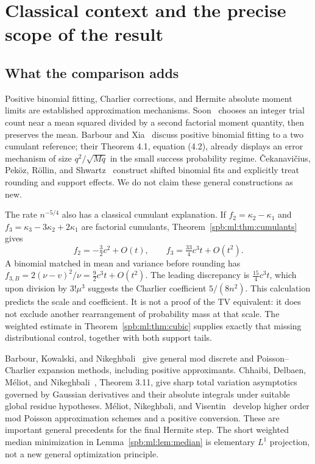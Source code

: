 \section{Classical context and the precise scope of the result}\label{spb:ml:sec:context}
\subsection{What the comparison adds}
Positive binomial fitting, Charlier corrections, and Hermite absolute moment limits are established approximation mechanisms. Soon~\cite{soon} chooses an integer trial count near a mean squared divided by a second factorial moment quantity, then preserves the mean. Barbour and Xia~\cite{bx} discuss positive binomial fitting to a two cumulant reference; their Theorem 4.1, equation (4.2), already displays an error mechanism of size $q^2/\sqrt{Mq}$ in the small success probability regime. \v{C}ekanavi\v{c}ius, Pek\"oz, R\"ollin, and Shwartz~\cite{cprs} construct shifted binomial fits and explicitly treat rounding and support effects. We do not claim these general constructions as new.

The rate $n^{-5/4}$ also has a classical cumulant explanation. If $f_2=\kappa_2-\kappa_1$ and $f_3=\kappa_3-3\kappa_2+2\kappa_1$ are factorial cumulants, Theorem~\ref{spb:ml:thm:cumulants} gives
\[
 f_2=-\tfrac32c^2+O(t),\qquad f_3=\tfrac{33}{4}c^3t+O(t^2).
\]
A binomial matched in mean and variance before rounding has $f_{3,B}=2(\nu-v)^2/\nu=\tfrac92c^3t+O(t^2)$. The leading discrepancy is $\tfrac{15}{4}c^3t$, which upon division by $3!\mu^3$ suggests the Charlier coefficient $5/(8n^2)$. This calculation predicts the scale and coefficient. It is not a proof of the TV equivalent: it does not exclude another rearrangement of probability mass at that scale. The weighted estimate in Theorem~\ref{spb:ml:thm:cubic} supplies exactly that missing distributional control, together with both support tails.

Barbour, Kowalski, and Nikeghbali~\cite{bkn} give general mod discrete and Poisson--Charlier expansion methods, including positive approximants. Chhaibi, Delbaen, M\'eliot, and Nikeghbali~\cite{cdmn}, Theorem 3.11, give sharp total variation asymptotics governed by Gaussian derivatives and their absolute integrals under suitable global residue hypotheses. M\'eliot, Nikeghbali, and Visentin~\cite{mnv} develop higher order mod Poisson approximation schemes and a positive conversion. These are important general precedents for the final Hermite step. The short weighted median minimization in Lemma~\ref{spb:ml:lem:median} is elementary $L^1$ projection, not a new general optimization principle.

